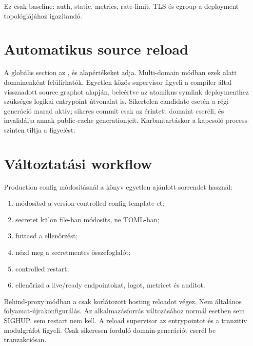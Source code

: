 Ez csak baseline: auth, static, metrics, rate-limit, TLS és cgroup a deployment topológiájához igazítandó.


\section{Automatikus source reload}

A globális \code{[reload]} section az ,  és  alapértékeket adja. Multi-domain módban ezek  alatt domainenként felülírhatók. Egyetlen közös supervisor figyeli a compiler által visszaadott source graphot  alapján, beleértve az atomikus symlink deploymenthez szükséges logikai entrypoint útvonalat is. Sikertelen candidate esetén a régi generáció marad aktív; sikeres commit csak az érintett domaint cseréli, és invalidálja annak public-cache generationjeit. Karbantartáskor a  kapcsoló process-szinten tiltja a figyelést.

\section{Változtatási workflow}

Production config módosításnál a könyv egyetlen ajánlott sorrendet használ:

\begin{enumerate}
  \item módosítsd a version-controlled config template-et;
  \item secretet külön file-ban módosíts, ne TOML-ban;
  \item futtasd a  ellenőrzést;
  \item nézd meg a  secretmentes összefoglalót;
  \item controlled restart;
  \item ellenőrizd a live/ready endpointokat, logot, metricet és auditot.
\end{enumerate}

Behind-proxy módban a  csak korlátozott hosting reloadot végez. Nem általános folyamat-újrakonfigurálás. Az alkalmazásforrás változásához normál esetben sem SIGHUP, sem restart nem kell. A reload supervisor az entrypointot és a tranzitív modulgráfot figyeli. Csak sikeresen forduló domain-generációt cserél be tranzakciósan.
